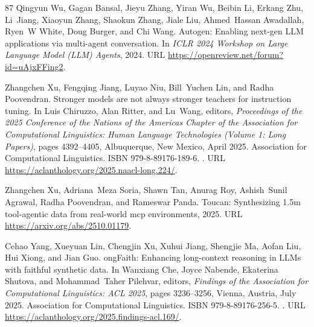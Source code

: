 \begin{thebibliography}{87}
Qingyun Wu, Gagan Bansal, Jieyu Zhang, Yiran Wu, Beibin Li, Erkang Zhu, Li~Jiang, Xiaoyun Zhang, Shaokun Zhang, Jiale Liu, Ahmed~Hassan Awadallah, Ryen~W White, Doug Burger, and Chi Wang.
\newblock Autogen: Enabling next-gen {LLM} applications via multi-agent conversation.
\newblock In \emph{ICLR 2024 Workshop on Large Language Model (LLM) Agents}, 2024.
\newblock URL \url{https://openreview.net/forum?id=uAjxFFing2}.

Zhangchen Xu, Fengqing Jiang, Luyao Niu, Bill~Yuchen Lin, and Radha Poovendran.
\newblock Stronger models are not always stronger teachers for instruction tuning.
\newblock In Luis Chiruzzo, Alan Ritter, and Lu~Wang, editors, \emph{Proceedings of the 2025 Conference of the Nations of the Americas Chapter of the Association for Computational Linguistics: Human Language Technologies (Volume 1: Long Papers)}, pages 4392--4405, Albuquerque, New Mexico, April 2025{}. Association for Computational Linguistics.
\newblock ISBN 979-8-89176-189-6.
\newblock {}.
\newblock URL \url{https://aclanthology.org/2025.naacl-long.224/}.

Zhangchen Xu, Adriana~Meza Soria, Shawn Tan, Anurag Roy, Ashish~Sunil Agrawal, Radha Poovendran, and Rameswar Panda.
\newblock Toucan: Synthesizing 1.5m tool-agentic data from real-world mcp environments, 2025{}.
\newblock URL \url{https://arxiv.org/abs/2510.01179}.

Cehao Yang, Xueyuan Lin, Chengjin Xu, Xuhui Jiang, Shengjie Ma, Aofan Liu, Hui Xiong, and Jian Guo.
ong{F}aith: Enhancing long-context reasoning in {LLM}s with faithful synthetic data.
\newblock In Wanxiang Che, Joyce Nabende, Ekaterina Shutova, and Mohammad~Taher Pilehvar, editors, \emph{Findings of the Association for Computational Linguistics: ACL 2025}, pages 3236--3256, Vienna, Austria, July 2025. Association for Computational Linguistics.
\newblock ISBN 979-8-89176-256-5.
\newblock {}.
\newblock URL \url{https://aclanthology.org/2025.findings-acl.169/}.


\end{thebibliography}
